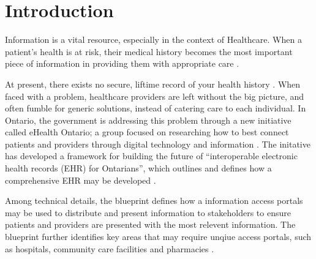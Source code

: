 
\section{Introduction}
\par Information is a vital resource, especially in the context of Healthcare. When a patient's health is at risk, their medical history becomes the most important piece of information in providing them with appropriate care \cite{web1}.

At present, there exists no secure, liftime record of your health history \cite{Street2014}. When faced with a problem, healthcare providers are left without the big picture, and often fumble for generic solutions, instead of catering care to each individual. In Ontario, the government is addressing this problem through a new initiative called eHealth Ontario; a group focused on researching how to best connect patients and providers through digital technology and information \cite{web1}. The initative has developed a framework for building the future of ``interoperable electronic health records (EHR) for Ontarians'', which outlines and defines how a comprehensive EHR may be developed \cite{b1}.

Among technical details, the blueprint defines how a information access portals may be used to distribute and present information to stakeholders to ensure patients and providers are presented with the most relevent information. The blueprint further identifies key areas that may require unqiue access portals, such as hospitals, community care facilities and pharmacies \cite{Street2014}.

\iffalse where access portals may be

 in the most effective and streamlined manner. The blueprint identifies key areas,


centralized system with standardized records, accessed by different portals may be used to

 The group has developed a technical blueprint for how health information may

The blueprint is the framework for building ``interoperable electrnoic health records for Ontarions'' \fi

\iffalse The Ontario government is looking to solve this problem through the eHealth Ontario initiative, a group researching how best to impliment digital technologies that connect patients and providers through information \cite{web1}.   One area indentified as requiring an information access portal \fi

